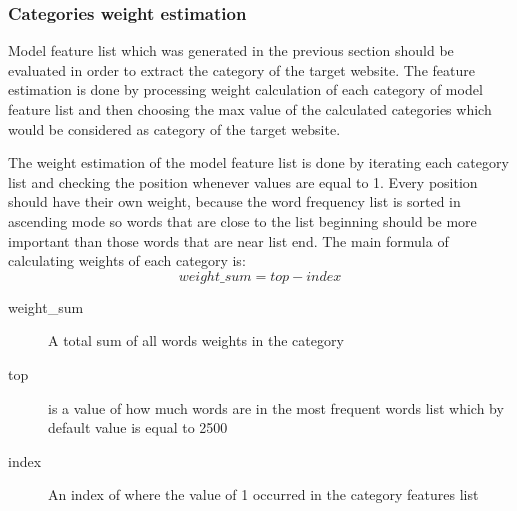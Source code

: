 \subsubsection{Categories weight estimation}


Model feature list which was generated in the previous section should be evaluated in order to extract the category of the target website. The feature estimation is done by processing weight calculation of each category of model feature list and then choosing the max value of the calculated categories which would be considered as category of the target website.


The weight estimation of the model feature list is done by iterating each category list and checking the position whenever values are equal to 1. Every position should have their own weight, because the word frequency list is sorted in ascending mode so words that are close to the list beginning should be more important than those words that are near list end. The main formula of calculating weights of each category is: 
\begin{equation}
    weight\_sum = top - index
\end{equation}
\begin{description}
    \item [weight\_sum] A total sum of all words weights in the category
    \item [top] is a value of how much words are in the most frequent words list which by default value is equal to 2500
    \item [index] An index of where the value of 1 occurred in the category features list
\end{description}


